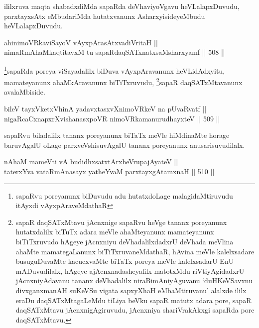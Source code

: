 \begin{artha}
ililxruva maqta shabadxdiMda sapaRda deVhaviyoVgavu heVLalapxDuvudu,
parxtayxsAtx eMbudariMda hutatxvanunx AsharxyisideyeMbudu
heVLalapxDuvudu.
\end{artha}

\begin{shl}
ahinimoVRkaviSayoV vAyxpArasAtxvadiVritaH || \\
nimaRmAhaMkaqtitavxM tu sapaRdaqSATxnatxsaMsharxyamf \hfill || 508 ||  
\end{shl}

\begin{artha}
\footnote{sapaRvu poreyanunx biDuvudu adu hutatxdoLage
malagidaMtiruvudu itAyxdi vAyxpAraveMdathaR}sapaRda poreya viSayadalilx biDuva vAyxpAravanunx
heVLidAdxyitu, mamateyanunx ahaMkAravanunx
biTiTxruvudu, \footnote{sapaR daqSATxMtavu jAcnxnige sapaRvu heVge
tananx poreyanunx hutatxdalilx biTuTx adara meVle ahaMteyanunx
mamateyanunx biTiTxruvudo hAgeye jAcnxniyu deVhadalilxdadxrU deVhada
meVlina ahaMte mamategaLanunx biTiTxruvaneMdathaR, hAvina meVle
kalelxsadare busuguDuvaMte kacucxvaMte biTaTx poreya meVle
kalelxsadarU EnU mADuvudilalx, hAgeye ajAcnxnadasheyalilx matotxMdu
riVtiyAgidadxrU jAcnxniyAdavanu tananx deVhadalilx
niraBimAniyAguvanu `duHKeVSavxnu divxganxmanAH suKeVSu vigata sapxyXhaH eMbaMtiruvanu' alalxde ililx eraDu daqSATxMtagaLeMdu
tiLiya beVku sapaR matutx adara pore, sapaR daqSATxMtavu
jAcnxnigAgiruvudu,  jAcnxniya shariVrakAkxgi sapaRda pore daqSATxMtavu.}sapaR daqSATxMtavanunx avalaMbiside.
\end{artha}

\begin{shl}
bileV tayxVketxV\s hinA yadavxtasxvXnimoVRkeV na pUvaRvatf || \\
nigaRcaCxnapxrXvishanasxpoVR nimoVRkamanurudhayxteV \hfill || 509 ||  
\end{shl}

\begin{artha}
sapaRvu biladalilx tananx poreyanunx biTaTx meVle hiMdinaMte horage
baruvAgalU oLage parxveVshisuvAgalU tananx poreyanunx
anusarisuvudilalx.
\end{artha}


\begin{shl}
nAhaM mameVti vA budidhxsatxtArxheVrupajAyateV || \\
taterxYva vataRmAnasayx yatheYvaM parxtayxgAtamxnaH \hfill || 510 ||  
\end{shl}

